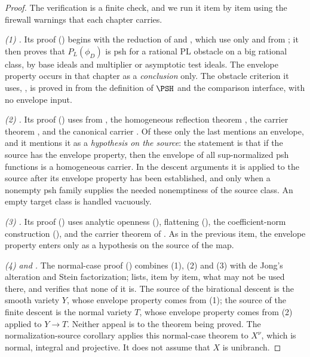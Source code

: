 \begin{proof}
The verification is a finite check, and we run it item by item using the
firewall warnings that each chapter carries.

\emph{(1) .}  Its proof
() begins with the reduction of
 and ,
which use only  and
 from ; it then proves
that $P_L(\phi_D)$ is psh for a rational PL obstacle on a big rational
class, by base ideals and multiplier or asymptotic test ideals.  The
envelope property occurs in that chapter as a \emph{conclusion} only.  The
obstacle criterion it uses, , is proved
in  from the definition of $\PSH$ and the
comparison interface, with no envelope input.

\emph{(2) .}  Its proof
() uses  from
, the homogeneous reflection theorem
, the carrier theorem
, and the canonical carrier
.  Of these only the last mentions an
envelope, and it mentions it as a \emph{hypothesis on the source}: the
statement is that if the source has the envelope property, then the envelope
of all sup-normalized psh functions is a homogeneous carrier.  In the descent arguments it is applied to the source after its envelope
property has been established, and only when a nonempty psh family supplies
the needed nonemptiness of the source class.  An empty target class is
handled vacuously.

\emph{(3) .}  Its proof
() uses analytic openness
(), flattening
(), the coefficient-norm construction
(), and the carrier theorem of
.  As in the previous item, the envelope property
enters only as a hypothesis on the source of the map.

\emph{(4)  and
.}  The normal-case proof
() combines (1), (2) and (3) with de Jong's
alteration and Stein factorization;  lists, item by item, what may not be
used there, and  verifies that
none of it is.  The source of the birational descent is the smooth variety
$Y$, whose envelope property comes from (1); the source of the finite
descent is the normal variety $T$, whose envelope property comes from (2)
applied to $Y\to T$.  Neither appeal is to the theorem being proved.
The normalization-source corollary applies this normal-case theorem to
$X^\nu$, which is normal, integral and projective.  It does not assume
that $X$ is unibranch.


\end{proof}
